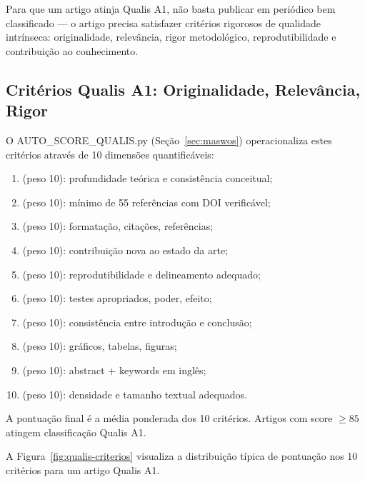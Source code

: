 Para que um artigo atinja Qualis A1, não basta publicar em periódico
bem classificado — o artigo precisa satisfazer critérios rigorosos
de qualidade intrínseca: originalidade, relevância, rigor
metodológico, reprodutibilidade e contribuição ao conhecimento.

\subsection{Critérios Qualis A1: Originalidade, Relevância, Rigor}

O AUTO\_SCORE\_QUALIS.py (Seção~\ref{sec:maswos}) operacionaliza
estes critérios através de 10 dimensões quantificáveis:

\begin{enumerate}
\item {} (peso 10): profundidade teórica e
consistência conceitual;
\item {} (peso 10): mínimo de 55
referências com DOI verificável;
\item {} (peso 10): formatação, citações,
referências;
\item {} (peso 10): contribuição nova ao
estado da arte;
\item {} (peso 10): reprodutibilidade e
delineamento adequado;
\item {} (peso 10): testes apropriados,
poder, efeito;
\item {} (peso 10): consistência entre introdução
e conclusão;
\item {} (peso 10): gráficos, tabelas,
figuras;
\item {} (peso 10): abstract + keywords
em inglês;
\item {} (peso 10): densidade e tamanho
textual adequados.
\end{enumerate}

A pontuação final é a média ponderada dos 10 critérios. Artigos com
score $\geq 85$ atingem classificação Qualis A1.

A Figura~\ref{fig:qualis-criterios} visualiza a distribuição típica
de pontuação nos 10 critérios para um artigo Qualis A1.

